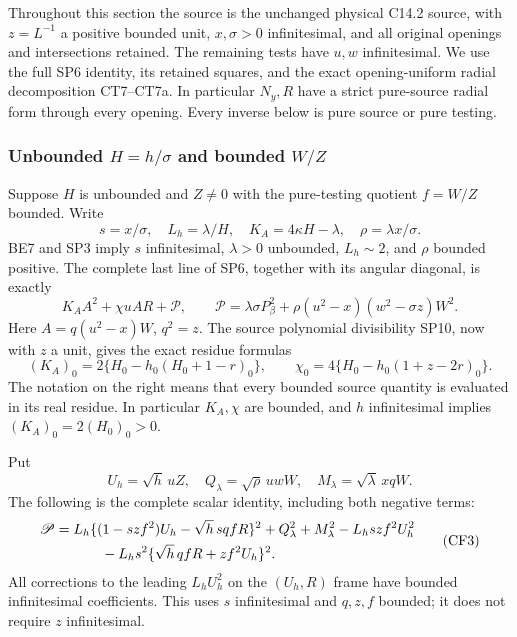 \label{p98e371f5b846:sec:r19-c142-complements}

Throughout this section the source is the unchanged physical C14.2
source, with $z=L^{-1}$ a positive bounded unit, $x,\sigma>0$
infinitesimal, and all original openings and intersections retained.
The remaining tests have $u,w$ infinitesimal. We use the full SP6
identity, its retained squares, and the exact opening-uniform radial
decomposition CT7--CT7a. In particular $N_y,R$ have a strict
pure-source radial form through every opening. Every inverse below is
pure source or pure testing.

\subsubsection*{Unbounded $H=h/\sigma$ and bounded $W/Z$}

Suppose $H$ is unbounded and $Z\ne0$ with the pure-testing quotient
$f=W/Z$ bounded. Write
\[
 s=x/\sigma,\quad L_h=\lambda/H,\quad
 K_A=4\kappa H-\lambda,\quad \rho=\lambda x/\sigma.
\]
BE7 and SP3 imply $s$ infinitesimal, $\lambda>0$ unbounded,
$L_h\sim2$, and $\rho$ bounded positive. The complete last line of
SP6, together with its angular diagonal, is exactly
\[
 K_A A^2+\chi uAR+\mathscr P,\qquad
 \mathscr P=\lambda\sigma P_\beta^2
       +\rho(u^2-x)(w^2-\sigma z)W^2.                 \tag{CF1}
\]
Here $A=q(u^2-x)W$, $q^2=z$. The source polynomial divisibility
SP10, now with $z$ a unit, gives the exact residue formulas
\[
 (K_A)_0=2\{H_0-h_0(H_0+1-r)_0\},\qquad
 \chi_0=4\{H_0-h_0(1+z-2r)_0\}.                    \tag{CF2}
\]
The notation on the right means that every bounded source quantity
is evaluated in its real residue. In particular $K_A,\chi$ are
bounded, and $h$ infinitesimal implies $(K_A)_0=2(H_0)_0>0$.

Put
\[
 U_h=\sqrt h\,uZ,\quad Q_\lambda=\sqrt\rho\,uwW,
 \quad M_\lambda=\sqrt\lambda\,xqW.
\]
The following is the complete scalar identity, including both
negative terms:
\[
\begin{split}
 \mathscr P={}&L_h\{(1-szf^2)U_h-\sqrt h\,sqfR\}^2
       +Q_\lambda^2+M_\lambda^2-L_hszf^2U_h^2\\
 &\hspace{7mm}-L_hs^2\{\sqrt h\,qfR+zf^2U_h\}^2.
\end{split}                                                   \tag{CF3}
\]
All corrections to the leading $L_hU_h^2$ on the $(U_h,R)$
frame have bounded infinitesimal coefficients. This uses $s$ infinitesimal
and $q,z,f$ bounded; it does not require $z$ infinitesimal.

